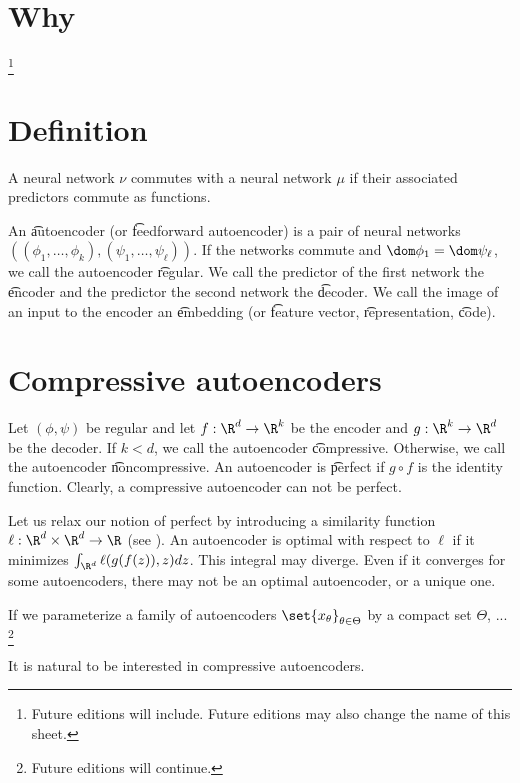 
\section*{Why}

\ifhmode\unskip\fi\footnote{
Future editions will include. Future editions may also change the name of this sheet.
}
\section*{Definition}

A neural network $\nu $ commutes with a neural network $\mu $ if their associated predictors commute as functions.

An \t{autoencoder} (or \t{feedforward autoencoder}) is a pair of neural networks $((\phi _1, \dots , \phi _k), (\psi _1, \dots , \psi _\ell ))$.
If the networks commute and $\dom \phi _1 = \dom \psi _\ell $, we call the autoencoder \t{regular}.
We call the predictor of the first network the \t{encoder} and the predictor the second network the \t{decoder}.
We call the image of an input to the encoder an \t{embedding} (or \t{feature vector}, \t{representation}, \t{code}).

\section*{Compressive autoencoders}

Let $(\phi , \psi )$ be regular and let $f: \R ^d \to \R ^k$ be the encoder and $g: \R ^k \to \R ^d$ be the decoder.
If $k < d$, we call the autoencoder \t{compressive}.
Otherwise, we call the autoencoder \t{noncompressive}.
An autoencoder is \t{perfect} if $g \circ f$ is the identity function.
Clearly, a compressive autoencoder can not be perfect.

Let us relax our notion of perfect by introducing a similarity function $\ell : \R ^d \times \R ^d \to \R $ (see ).
An autoencoder is optimal with respect to $\ell $ if it minimizes $\int_{\R ^d} \ell (g(f(z)), z) dz$.
This integral may diverge.
Even if it converges for some autoencoders, there may not be an optimal autoencoder, or a unique one.

If we parameterize a family of autoencoders $\set{x_{\theta }}_{\theta  \in \Theta }$ by a compact set $\Theta $, ...
    \ifhmode\unskip\fi\footnote{
Future editions will continue.
    }

It is natural to be interested in compressive autoencoders.

\blankpage